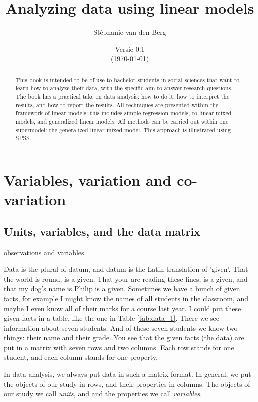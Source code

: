\documentclass[]{report}\usepackage[]{graphicx}\usepackage[]{color}
\title{Analyzing data using linear models}
\author{St\'ephanie van den Berg}
\date{Versie 0.1 \\ (\today)}
\begin{document}
\maketitle




\begin{abstract}
This book is intended to be of use to bachelor students in social sciences that want to learn how to analyze their data, with the specific aim to answer research questions. The book has a practical take on data analysis: how to do it, how to interpret the results, and how to report the results. All techniques are presented within the framework of linear models: this includes simple regression models, to linear mixed models, and generalized linear models. All methods can be carried out within one supermodel: the generalized linear mixed model. This approach is illustrated using SPSS.
\end{abstract}


\tableofcontents



\chapter{Variables, variation and co-variation} \label{chap:intro}



\section{Units, variables, and the data matrix}


observations and variables 


Data is the plural of datum, and datum is the Latin translation of 'given'. That the world is round, is a given. That your are reading these lines, is a given, and that my dog's name is Philip is a given. Sometimes we have a bunch of given facts, for example I might know the names of all students in the classroom, and maybe I even know all of their marks for a course last year. I could put these given facts in a table, like the one in Table \ref{tab:data_1}. There we see information about seven students. And of these seven students we know two things: their name and their grade. You see that the given facts (the data) are put in a matrix with seven rows and two columns. Each row stands for one student, and each column stands for one property. 

In data analysis, we always put data in such a matrix format. In general, we put the objects of our study in rows, and their properties in columns. The objects of our study we call \textit{units}, and and the properties we call \textit{variables}.
\end{document}

